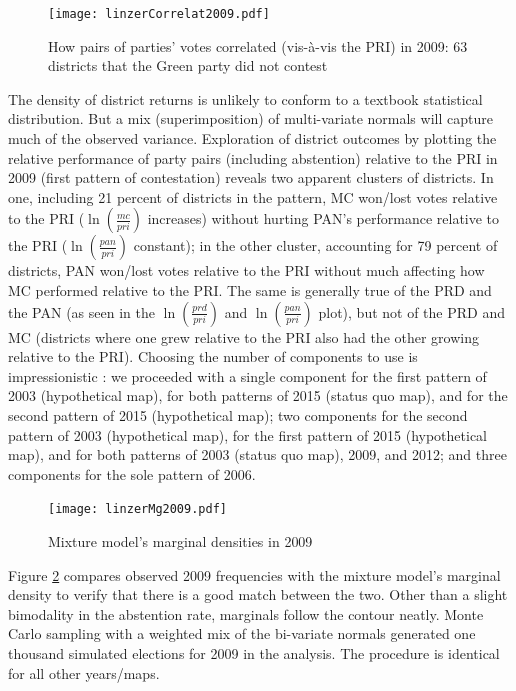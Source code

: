 \documentclass[letter,12pt]{article}
\begin{document}
\begin{figure}
\centering 
  \texttt{[image: linzerCorrelat2009.pdf]} 
  \caption{How pairs of parties' votes correlated (vis-\`a-vis the PRI) in 2009: 63 districts that the Green party did not contest}\label{F:linzerCorr}
\end{figure}

The density of district returns is unlikely to conform to a textbook statistical distribution. But a mix (superimposition) of multi-variate normals will capture much of the observed variance. Exploration of district outcomes by plotting the relative performance of party pairs (including abstention) relative to the PRI in 2009 (first pattern of contestation) reveals two apparent clusters of districts. In one, including 21 percent of districts in the pattern, MC won/lost votes relative to the PRI ($\ln(\frac{mc}{pri})$ increases) without hurting PAN's performance relative to the PRI ($\ln(\frac{pan}{pri})$ constant); in the other cluster, accounting for 79 percent of districts, PAN won/lost votes relative to the PRI without much affecting how MC performed relative to the PRI. The same is generally true of the PRD and the PAN (as seen in the $\ln(\frac{prd}{pri})$ and $\ln(\frac{pan}{pri})$ plot), but not of the PRD and MC (districts where one grew relative to the PRI also had the other growing relative to the PRI). Choosing the number of components to use is impressionistic \citep[][:405]{linzerSeatVoteElasticity2012}: we proceeded with a single component for the first pattern of 2003 (hypothetical map), for both patterns of 2015 (status quo map), and for the second pattern of 2015 (hypothetical map); two components for the second pattern of 2003 (hypothetical map), for the first pattern of 2015 (hypothetical map), and for both patterns of 2003 (status quo map), 2009, and 2012; and three components for the sole pattern of 2006.

\begin{figure}
\centering 
  \texttt{[image: linzerMg2009.pdf]} 
  \caption{Mixture model's marginal densities in 2009}\label{F:linzerMg}
\end{figure}

Figure \ref{F:linzerMg} compares observed 2009 frequencies with the mixture model's marginal density to verify that there is a good match between the two. Other than a slight bimodality in the abstention rate, marginals follow the contour neatly. Monte Carlo sampling with a weighted mix of the bi-variate normals generated one thousand simulated elections for 2009 in the analysis. The procedure is identical for all other years/maps. 
\end{document}
